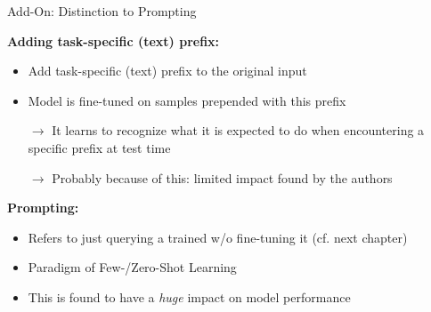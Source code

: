 
\begin{frame}{Add-On: Distinction to Prompting}

\vfill

	\textbf{Adding task-specific (text) prefix:}

	\begin{itemize}
		\item Add task-specific (text) prefix to the original input
		\item Model is fine-tuned on samples prepended with this prefix
		\item[$\to$] It learns to recognize what it is expected to do when encountering a specific prefix at test time
		\item[$\to$] Probably because of this: limited impact found by the authors
	\end{itemize}
	
	\vspace{.5cm}

	\textbf{Prompting:}

	\begin{itemize}
		\item Refers to just querying a trained w/o fine-tuning it (cf. next chapter)
		\item Paradigm of Few-/Zero-Shot Learning
		\item This is found to have a \textit{huge} impact on model performance
	\end{itemize}
	
\vfill

\end{frame}


